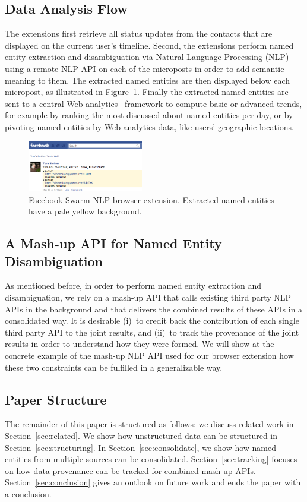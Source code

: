 \documentclass[twocolumn]{article}
\begin{document}
\subsection{Data Analysis Flow}
The extensions first retrieve all status updates from the contacts that are displayed on the current user's timeline. Second, the extensions perform named entity extraction and disambiguation via Natural Language Processing (NLP) using a remote NLP API on each of the microposts in order to add semantic meaning to them. The extracted named entities are then displayed below each micropost, as illustrated in Figure~\ref{fig:facebook}. Finally the extracted named entities are sent to a central Web analytics~\cite{Kaushik} framework to compute basic or advanced trends, for example by ranking the most discussed-about named entities per day, or by pivoting named entities by Web analytics data, like users' geographic locations.

\begin{figure}[htb!]
  \centering
    \includegraphics[width=0.45\textwidth]{facebook-swarm-nlp.png}
  \caption{Facebook Swarm NLP browser extension. Extracted named entities have a pale yellow background.}     
  \label{fig:facebook}
\end{figure}

\subsection{A Mash-up API for Named Entity Disambiguation}
As mentioned before, in order to perform named entity extraction and disambiguation, we rely on a mash-up API that calls existing third party NLP APIs in the background and that delivers the combined results of these APIs in a consolidated way. It is  desirable (i)~to credit back the contribution of each single third party API to the joint results, and (ii)~to track the provenance of the joint results in order to understand how they were formed. We will show at the concrete example of the mash-up NLP API used for our browser extension how these two constraints can be fulfilled in a generalizable way.

\subsection{Paper Structure}
The remainder of this paper is structured as follows: we discuss related work in Section~\ref{sec:related}. We show how unstructured data can be structured in Section~\ref{sec:structuring}. In Section~\ref{sec:consolidate}, we show how named entities from multiple sources can be consolidated. Section~\ref{sec:tracking} focuses on how data provenance can be tracked for combined mash-up APIs. Section~\ref{sec:conclusion} gives an outlook on future work and ends the paper with a conclusion. 
\end{document}
